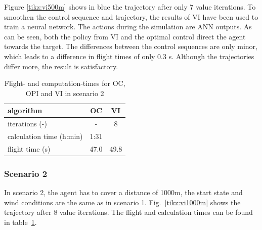 Figure \ref{tikz:vi500m} shows in blue the trajectory after only 7 value iterations. To smoothen the control sequence and trajectory, the results of VI have been used to train a neural network. The actions during the simulation are ANN outputs. As can be seen, both the policy from VI and the optimal control direct the agent towards the target. The differences between the control sequences are only minor, which leads to a difference in flight times of only 0.3 s. Although the trajectories differ more, the result is satisfactory.

\begin{table}[htb]
	\begin{center}
		\begin{tabular}{l|c c}
			algorithm & OC & VI \\ \hline 
			iterations (-) & - & 8 \\
			calculation time (h:min) & 1:31 &  \\
			flight time (s) & 47.0 & 49.8
		\end{tabular}
		\caption{Flight- and computation-times for OC, OPI and VI in scenario 2}
		\label{tab:2d_flight_data_1000m}
	\end{center}
\end{table}
\FloatBarrier

\subsubsection{Scenario 2}

In scenario 2, the agent has to cover a distance of 1000m, the start state and wind conditions are the same as in scenario 1. Fig.~\ref{tikz:vi1000m} shows the trajectory after 8 value iterations. The flight and calculation times can be found in table~\ref{tab:2d_flight_data_1000m}.

